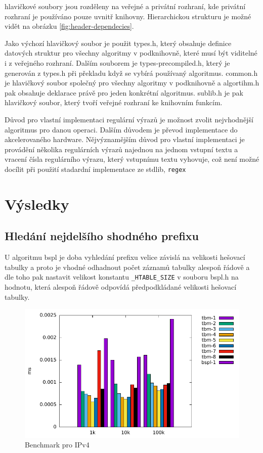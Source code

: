 hlavičkové soubory jsou rozděleny na veřejné a privátní rozhraní, kde privátní rozhraní je používáno pouze uvnitř knihovny. Hierarchickou strukturu je možné vidět na obrázku \ref{fig:header-dependecies}.

Jako výchozí hlavičkový soubor je použit types.h, který obsahuje definice datových struktur pro všechny algoritmy v podknihovně, které musí být viditelné i z veřejného rozhraní. Dalším souborem je types-precompiled.h, který je generován z types.h při překladu když se vybírá používaný algoritmus. common.h je hlavičkový soubor společný pro všechny algoritmy v podknihovně a algortihm.h pak obsahuje deklarace právě pro jeden konkrétní algoritmus.
sublib.h je pak hlavičkový soubor, který tvoří veřejné rozhraní ke knihovním funkcím.



Důvod pro vlastní implementaci regulární výrazů je možnost zvolit nejvhodnější algoritmus pro danou operaci.
Dalším důvodem je převod implementace do akcelerovaného hardware.
Nějvýznamějším důvod pro vlastní implementaci je provádění několika regulárních výrazů najednou na jednom vstupní textu a vracení čísla regulárního výrazu, který vstupnímu textu vyhovuje, což není možné docílit při použití stadardní implementace ze stdlib, {\tt regex}

\chapter{Výsledky}
\section{Hledání nejdelšího shodného prefixu}
U algoritmu bspl je doba vyhledání prefixu velice závislá na velikosti hešovací tabulky a proto je vhodné odhadnout počet záznamů tabulky alespoň řádově a dle toho pak nastavit velikost konstantu {\tt \_HTABLE\_SIZE} v souboru bspl.h na hodnotu, která alespoň řádově odpovídá předpodkládané velikosti hešovací tabulky.

\begin{figure}[!htb]
\centering
\includegraphics[scale=1]{fig/lpm-ipv4.pdf}
\caption{Benchmark pro IPv4}
\label{fig:lpm-ipv4}
\end{figure}

